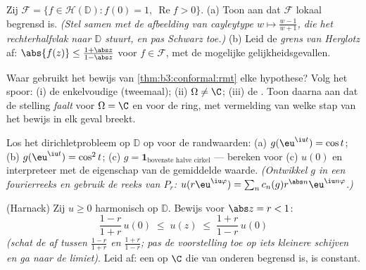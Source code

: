 \begin{exercise}[$\star\star$]\label{exo:b3:conformal:6}
Zij $\mathcal F = \{f \in \mathcal H(\mathbb D) : f(0) = 1,\
\operatorname{Re}f > 0\}$.
(a) Toon aan dat $\mathcal F$ lokaal begrensd is. \emph{(Stel
samen met de afbeelding van cayleytype $w \mapsto \frac{w - 1}{w
+ 1}$, die het rechterhalfvlak naar $\mathbb D$ stuurt, en pas
Schwarz toe.)}
(b) Leid de \emph{grens van Herglotz} af: $\abs{f(z)} \leq
\frac{1 + \abs z}{1 - \abs z}$ voor $f \in \mathcal F$, met de
mogelijke gelijkheidsgevallen.
\end{exercise}

\begin{exercise}[$\star\star\star$]\label{exo:b3:conformal:7}
Waar gebruikt het bewijs van \cref{thm:b3:conformal:rmt} elke
hypothese? Volg het spoor: (i) de enkelvoudige 
(tweemaal); (ii) $\Omega \neq \C$; (iii) de \omterm{def:b3:topology:connected}{samenhang}. Toon
daarna aan dat de stelling \emph{faalt} voor $\Omega = \C$ en
voor de ring, met vermelding van welke stap van het bewijs in elk
geval breekt.
\end{exercise}

\begin{exercise}[$\star\star$]\label{exo:b3:conformal:8}
Los het dirichletprobleem op $\mathbb D$ op voor de randwaarden:
(a) $g(\eu^{\iu t}) = \cos t$; (b) $g(\eu^{\iu t}) = \cos^2 t$;
(c) $g = \mathbf 1_{\text{bovenste halve cirkel}}$ --- bereken
voor (c) $u(0)$ en interpreteer met de eigenschap van de
gemiddelde waarde. \emph{(Ontwikkel $g$ in een fourierreeks en
gebruik de reeks van $P_r$: $u(r\eu^{\iu\varphi}) = \sum_n c_n(g)
r^{\abs n}\eu^{\iu n\varphi}$.)}
\end{exercise}

\begin{exercise}[$\star\star\star$]\label{exo:b3:conformal:9}
(Harnack) Zij $u \geq 0$ harmonisch op $\mathbb D$. Bewijs voor
$\abs z = r < 1$:
\[
\frac{1 - r}{1 + r}\,u(0) \;\leq\; u(z) \;\leq\;
\frac{1 + r}{1 - r}\,u(0)
\]
\emph{(schat de  af tussen $\frac{1-r}{1+r}$ en
$\frac{1+r}{1-r}$; pas de voorstelling toe op iets kleinere
schijven en ga naar de limiet)}. Leid af: een 
op $\C$ die van onderen begrensd is, is constant.
\end{exercise}

